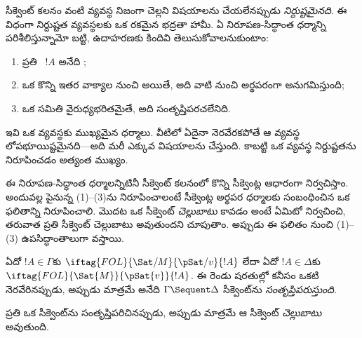\documentclass[../../../include/open-logic-section]{subfiles}
\begin{document}
      {}
      {}


\begin{explain}
సీక్వెంట్ కలనం వంటి  వ్యవస్థ నిజంగా చెల్లని
విషయాలను  చేయలేనప్పుడు \emph{నిర్దుష్టమైనది}. ఈ విధంగా
నిర్దుష్టత  వ్యవస్థలకు ఒక రకమైన భద్రతా హామీ.
ఏ నిరూపణ-సిద్ధాంత ధర్మాన్ని పరిశీలిస్తున్నామో బట్టి, ఉదాహరణకు
కిందివి తెలుసుకోవాలనుకుంటాం:
\begin{enumerate}
\item ప్రతి ~$!A$ అనేది ;
\item ఒక  కొన్ని ఇతర వాక్యాల నుంచి  అయితే,
  అది వాటి నుంచి అర్థపరంగా అనుగమిస్తుంది;
\item ఒక  సమితి వైరుధ్యభరితమైతే, అది
  సంతృప్తిపరచలేనిది.
\end{enumerate}
ఇవి ఒక  వ్యవస్థకు ముఖ్యమైన ధర్మాలు. వీటిలో ఏదైనా
నెరవేరకపోతే ఆ  వ్యవస్థ లోపభూయిష్టమైనది---అది మరీ ఎక్కువ
విషయాలను  చేస్తుంది. కాబట్టి ఒక  వ్యవస్థ
నిర్దుష్టతను నిరూపించడం అత్యంత ముఖ్యం.

ఈ నిరూపణ-సిద్ధాంత ధర్మాలన్నిటినీ సీక్వెంట్ కలనంలో కొన్ని సీక్వెంట్ల
 ఆధారంగా నిర్వచిస్తాం. అందువల్ల పైనున్న (1)--(3)ను
నిరూపించాలంటే  సీక్వెంట్ల అర్థపర ధర్మాలకు సంబంధించిన ఒక ఫలితాన్ని
నిరూపించాలి. మొదట ఒక సీక్వెంట్ \emph{చెల్లుబాటు} కావడం అంటే ఏమిటో
నిర్వచించి, తరువాత ప్రతి  సీక్వెంట్ చెల్లుబాటు అవుతుందని
చూపుతాం. అప్పుడు ఈ ఫలితం నుంచి (1)--(3) ఉపసిద్ధాంతాలుగా వస్తాయి.
\end{explain}

\begin{defn}
ఏదో $!A \in \Gamma$కు
$\iftag{FOL}{\Sat/{M}}{\pSat/{v}}{!A}$ లేదా ఏదో
$!A \in \Delta$కు $\iftag{FOL}{\Sat{M}}{\pSat{v}}{!A}$. ఈ రెండు షరతుల్లో
కనీసం ఒకటి నెరవేరినప్పుడు, అప్పుడు మాత్రమే  అనేది
$\Gamma \Sequent \Delta$ సీక్వెంట్‌ను \emph{సంతృప్తిపరుస్తుంది}.

ప్రతి  ఒక సీక్వెంట్‌ను
సంతృప్తిపరిచినప్పుడు, అప్పుడు మాత్రమే ఆ సీక్వెంట్ \emph{చెల్లుబాటు} అవుతుంది.
\end{defn}
\end{document}
